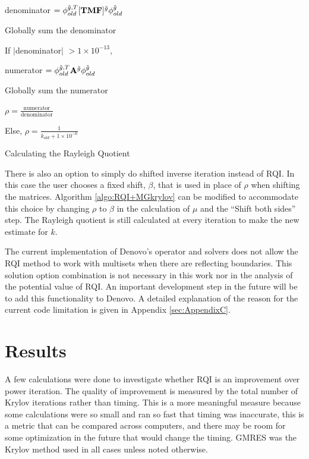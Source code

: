 %
\begin{algorithm}[!h]
  \begin{list}{}{\hspace{2.5em}}
    \item denominator $= \phi_{old}^{\tilde{g}, T} [\mathbf{TMF}]^{\tilde{g}} \phi_{old}^{\tilde{g}}$
    \item Globally sum the denominator
    \item If $|$denominator$|$ $> 1 \times 10^{-13}$, 
      \begin{list}{}{\hspace{1em}}
        \item numerator  $= \phi_{old}^{\tilde{g}, T} \mathbf{A}^{\tilde{g}} \phi_{old}^{\tilde{g}}$
        \item Globally sum the numerator
        \item $\rho = \frac{\text{numerator}}{\text{denominator}}$
      \end{list}
    \item Else, $\rho = \frac{1}{k_{old} + 1 \times 10^{-6}}$ 
  \end{list}
  \caption{Calculating the Rayleigh Quotient}
  \label{algo:calcRQ}
\end{algorithm}

There is also an option to simply do shifted inverse iteration instead of RQI. In this case the user chooses a fixed shift, $\beta$, that is used in place of $\rho$ when shifting the matrices. Algorithm \ref{algo:RQI+MGkrylov} can be modified to accommodate this choice by changing $\rho$ to $\beta$ in the calculation of $\mu$ and the ``Shift both sides'' step. The Rayleigh quotient is still calculated at every iteration to make the new estimate for $k$. 

The current implementation of Denovo's operator and solvers does not allow the RQI method to work with multisets when there are reflecting boundaries. This solution option combination is not necessary in this work nor in the analysis of the potential value of RQI. An important development step in the future will be to add this functionality to Denovo. A detailed explanation of the reason for the current code limitation is given in Appendix \ref{sec:AppendixC}.

\section{Results}
A few calculations were done to investigate whether RQI is an improvement over power iteration. The quality of improvement is measured by the total number of Krylov iterations rather than timing. This is a more meaningful measure because some calculations were so small and ran so fast that timing was inaccurate, this is a metric that can be compared across computers, and there may be room for some optimization in the future that would change the timing. GMRES was the Krylov method used in all cases unless noted otherwise.

